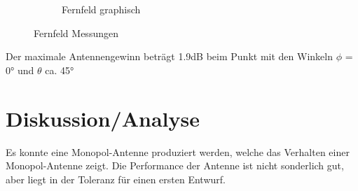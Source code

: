 \begin{figure}[htbp]
\begin{center}
\begin{subfigure}[t]{0.49\textwidth}
\begin{center}
				\caption{Fernfeld graphisch}
				\label{fig:Mess_Farfield_graph}
			\end{center}
		\end{subfigure}
		\caption{Fernfeld Messungen}
		\label{fig:Messungen_Fernfeld}
	\end{center}
\end{figure}

Der maximale Antennengewinn beträgt 1.9dB beim Punkt mit den Winkeln $\phi$ = 0° und $\theta$ ca. 45°\\

\newpage

\section{Diskussion/Analyse}
Es konnte eine Monopol-Antenne produziert werden, welche das Verhalten einer Monopol-Antenne zeigt. Die Performance der Antenne ist nicht sonderlich gut, aber liegt in der Toleranz für einen ersten Entwurf.

